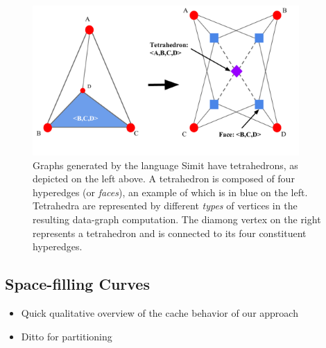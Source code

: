 \begin{figure}[h]
\centering
\includegraphics[width=4in]{tetrahedron.pdf}
\caption{Graphs generated by the language Simit have tetrahedrons,
as depicted on the left above.  A tetrahedron is composed of four
hyperedges (or \emph{faces}), an example
of which is in blue on the left.  Tetrahedra are represented by different
\emph{types} of vertices in the resulting data-graph computation.
The diamong vertex on the right represents a tetrahedron and is 
connected to its four constituent hyperedges.}
\label{fig:hyperedge}
\end{figure}



\subsection{Space-filling Curves}
		\begin{itemize}
		\item Quick qualitative overview of the cache behavior of our approach 
		\item Ditto for partitioning 
		\end{itemize}


